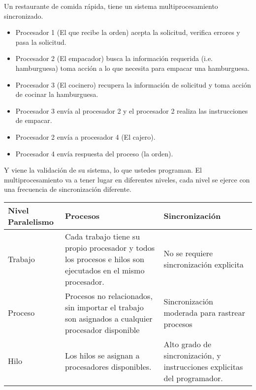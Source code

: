 Un restaurante de comida rápida, tiene un sistema multiprocesamiento sincronizado.
\begin{itemize}
	\item Procesador 1 (El que recibe la orden) acepta la solicitud, verifica errores y pasa la solicitud.
	\item Procesador 2 (El empacador) busca la información requerida (i.e. hamburguesa) toma acción a lo que necesita para empacar una hamburguesa.
	\item Procesador 3 (El cocinero) recupera la información de solicitud y toma acción de cocinar la hamburguesa.
	\item Procesador 3 envía al procesador 2 y el procesador 2 realiza las instrucciones de empacar.
	\item Procesador 2 envía a procesador 4 (El cajero).
	\item Procesador 4 envía respuesta del proceso (la orden).
\end{itemize}
Y viene la validación de su sistema, lo que ustedes programan.
El multiprocesamiento va a tener lugar en diferentes niveles, cada nivel se ejerce con una frecuencia de sincronización diferente.


{\raggedright

\vspace{3pt} \noindent
\begin{tabular}{|p{133pt}|p{133pt}|p{133pt}|}
\hline
\parbox{133pt}{\centering 
\textbf{Nivel Paralelismo}
} & \parbox{133pt}{\centering 
\textbf{Procesos}
} & \parbox{133pt}{\centering 
\textbf{Sincronización}
} \\
\hline
\parbox{133pt}{\centering 
Trabajo
} & \parbox{133pt}{\centering 
Cada trabajo tiene su propio procesador y todos los procesos e hilos son ejecutados en el mismo procesador.
} & \parbox{133pt}{\centering 
No se requiere sincronización explicita
} \\
\hline
\parbox{133pt}{\centering 
Proceso
} & \parbox{133pt}{\centering 
Procesos no relacionados, sin importar el trabajo son asignados a cualquier procesador disponible
} & \parbox{133pt}{\centering 
Sincronización moderada para rastrear procesos
} \\
\hline
\parbox{133pt}{\centering 
Hilo
} & \parbox{133pt}{\centering 
Los hilos se asignan a procesadores disponibles.
} & \parbox{133pt}{\centering 
Alto grado de sincronización, y instrucciones explicitas del programador.
} \\
\hline
\end{tabular}
\vspace{2pt}

}

